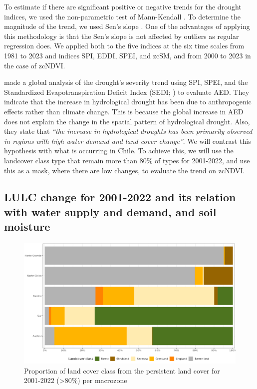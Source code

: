 \documentclass[
  number,
  preprint,
  3p,
  onecolumn]{elsarticle}
\begin{document}
To estimate if there are significant positive or negative trends for the
drought indices, we used the non-parametric test of Mann-Kendall
\citep{Kendall1975}. To determine the magnitude of the trend, we used
Sen's slope \citep{Sen1968}. One of the advantages of applying this
methodology is that the Sen's slope is not affected by outliers as
regular regression does. We applied both to the five indices at the six
time scales from 1981 to 2023 and indices SPI, EDDI, SPEI, and zcSM, and
from 2000 to 2023 in the case of zcNDVI.

\citep{Vicente-Serrano2021} made a global analysis of the drought's
severity trend using SPI, SPEI, and the Standardized Evapotranspiration
Deficit Index (SEDI; \citep{Vicente-Serrano2018}) to evaluate AED. They
indicate that the increase in hydrological drought has been due to
anthropogenic effects rather than climate change. This is because the
global increase in AED does not explain the change in the spatial
pattern of hydrological drought. Also, they state that \emph{``the
increase in hydrological droughts has been primarily observed in regions
with high water demand and land cover change''}. We will contrast this
hypothesis with what is occurring in Chile. To achieve this, we will use
the landcover class type that remain more than 80\% of types for
2001-2022, and use this as a mask, where there are low changes, to
evaluate the trend on zcNDVI.

\hypertarget{sec-methods_lulc}{%
\subsection{LULC change for 2001-2022 and its relation with water supply
and demand, and soil moisture}\label{sec-methods_lulc}}

\begin{figure}[!ht]

{\centering \includegraphics{../output/figs/LC_pers80_per_macrozone.png}

}

\caption{\label{fig-LCprop}Proportion of land cover class from the
persistent land cover for 2001-2022 (\textgreater80\%) per macrozone}

\end{figure}
\end{document}
